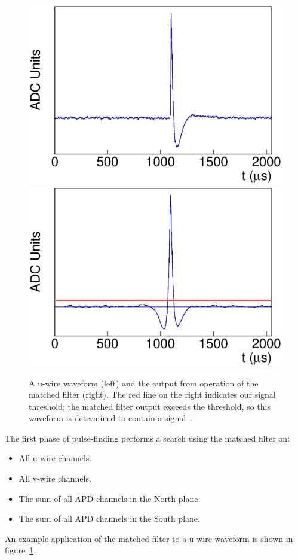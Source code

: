 \begin{figure}
\begin{center}
\includegraphics[keepaspectratio=true,width=.49\textwidth]{MFExamp_Raw.eps}
\includegraphics[keepaspectratio=true,width=.49\textwidth]{MFExamp_Applied.eps}
\end{center}
\renewcommand{\baselinestretch}{1}
\small\normalsize
\begin{quote}
\caption{A u-wire waveform (left) and the output from operation of the matched filter (right).  The red line on the right indicates our signal threshold; the matched filter output exceeds the threshold, so this waveform is determined to contain a signal~\cite{ReconstructionDocument}.}
\label{fig:MatchedFilterApplication}
\end{quote}
\end{figure}
\renewcommand{\baselinestretch}{2}
\small\normalsize

The first phase of pulse-finding performs a search using the matched filter on:
\begin{itemize}
\item All u-wire channels.
\item All v-wire channels.
\item The sum of all APD channels in the North plane.
\item The sum of all APD channels in the South plane.
\end{itemize}
An example application of the matched filter to a u-wire waveform is shown in figure~\ref{fig:MatchedFilterApplication}.

